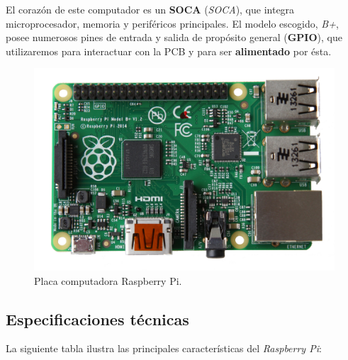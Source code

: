 El corazón de este computador es un \textbf{\acrshort{SOCA}} (\textit{\acrlong{SOCA}}), que integra microprocesador, memoria y periféricos principales. El modelo escogido, \textit{B+}, posee numerosos pines de entrada y salida de propósito general (\textbf{\acrshort{GPIO}}), que utilizaremos para interactuar con la \acrshort{PCB} y para ser \textbf{alimentado} por ésta.

\smallskip

\begin{figure}[H]
	\noindent \begin{centering}
		\includegraphics[width=\linewidth/2]{capitulo3/raspberry}
		\par\end{centering}
	\smallskip
	\caption{\label{fig:raspberry} Placa computadora Raspberry Pi.}
\end{figure} 

\smallskip

\subsection{Especificaciones técnicas}

La siguiente tabla ilustra las principales características del \textit{Raspberry Pi}:

\smallskip


